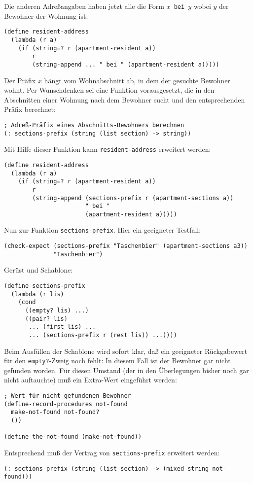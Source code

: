 Die anderen Adreßangaben haben jetzt alle die Form \texttt{$x$ bei
$y$} wobei $y$ der Bewohner der Wohnung ist:
%
\begin{verbatim}
(define resident-address
  (lambda (r a)
    (if (string=? r (apartment-resident a))
        r
        (string-append ... " bei " (apartment-resident a)))))
\end{verbatim}
%
Der Präfix $x$ hängt vom Wohnabschnitt ab, in dem der gesuchte
Bewohner wohnt.  Per Wunschdenken sei eine Funktion vorausgesetzt, die
in den Abschnitten einer Wohnung nach dem Bewohner sucht und den
entsprechenden Präfix berechnet:
%
\begin{verbatim}
; Adreß-Präfix eines Abschnitts-Bewohners berechnen
(: sections-prefix (string (list section) -> string))
\end{verbatim}
%
Mit Hilfe dieser Funktion kann \texttt{resident-address} erweitert
werden:
%
\begin{verbatim}
(define resident-address
  (lambda (r a)
    (if (string=? r (apartment-resident a))
        r
        (string-append (sections-prefix r (apartment-sections a))
                       " bei "
                       (apartment-resident a)))))
\end{verbatim}
%
Nun zur Funktion \texttt{sections-prefix}.  Hier ein geeigneter
Testfall:
%
\begin{verbatim}
(check-expect (sections-prefix "Taschenbier" (apartment-sections a3))
              "Taschenbier")
\end{verbatim}
%
Gerüst und Schablone:
%
\begin{verbatim}
(define sections-prefix
  (lambda (r lis)
    (cond
      ((empty? lis) ...)
      ((pair? lis)
       ... (first lis) ...
       ... (sections-prefix r (rest lis)) ...))))
\end{verbatim}
%
Beim Ausfüllen der Schablone wird sofort klar, daß ein geeigneter
Rückgabewert für den \texttt{empty?}-Zweig noch fehlt: In diesem Fall
ist der Bewohner gar nicht gefunden worden.  Für diesen Umstand (der
in den Überlegungen bisher noch gar nicht auftauchte) muß
ein Extra-Wert eingeführt werden:
%
\begin{verbatim}
; Wert für nicht gefundenen Bewohner
(define-record-procedures not-found
  make-not-found not-found?
  ())

(define the-not-found (make-not-found))
\end{verbatim}
%
Entsprechend muß der Vertrag von \texttt{sections-prefix} erweitert
werden:
%
\begin{verbatim}
(: sections-prefix (string (list section) -> (mixed string not-found)))
\end{verbatim}
